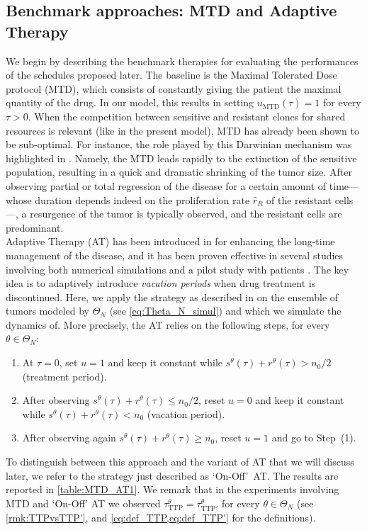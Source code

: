 \documentclass[a4paper,12pt, reqno]{amsart}
\theoremstyle{plain}
\theoremstyle{definition}
\theoremstyle{remark}
\numberwithin{equation}{section}
\begin{document}
\subsection{Benchmark approaches: MTD and Adaptive Therapy} \label{subsec:benchmark}
We begin by describing the benchmark therapies for evaluating the performances of the schedules proposed later.
The baseline is the Maximal Tolerated Dose protocol (MTD), which consists of constantly giving the patient the maximal quantity of the drug. In our model, this results in setting $u_{\mathrm{MTD}}(\tau) = 1$ for every $\tau>0$.
When the competition between sensitive and resistant clones for shared resources is relevant (like in the present model), MTD has already been shown to be sub-optimal. For instance, the role played by this Darwinian mechanism was highlighted in \cite{moff2012evolutionary}.
Namely, the MTD leads rapidly to the extinction of the sensitive population, resulting in a quick and dramatic shrinking of the tumor size. 
After observing partial or total regression of the disease for a certain amount of time---whose duration depends indeed on the proliferation rate $\hat r_R$ of the resistant cells---, a resurgence of the tumor is typically observed, and the resistant cells are predominant. \\
Adaptive Therapy (AT) has been introduced in \cite{moff2009adaptive} for enhancing the long-time management of the disease, and it has been proven effective in several studies involving both numerical simulations \cite{moff2017zhang} and a pilot study with patients \cite{moff2017zhang,moff2022evolution}. 
The key idea is to adaptively introduce \emph{vacation periods} when drug treatment is discontinued.
Here, we apply the strategy as described in  \cite{turnover2021} on the ensemble of tumors modeled by $\Theta_N$ (see \cref{eq:Theta_N_simul}) and which we simulate the {dynamics} of. 
More precisely, the AT relies on the following steps, for every $\theta\in\Theta_N$:
\begin{enumerate}
\item At $\tau =0$, set {$u=1$} and keep it constant while $s^\theta(\tau) + r^\theta(\tau)> n_0/2$ (treatment period).
\item After observing $s^\theta(\tau)+r^\theta(\tau)\leq n_0/2$, reset {$u=0$} and keep it constant while  $s^\theta(\tau) + r^\theta(\tau)< n_0$ (vacation period).
\item After observing again $s^\theta(\tau) + r^\theta(\tau) \geq n_0$, reset {$u=1$} and go to Step~(1).
\end{enumerate}
To distinguish between this approach and the variant of AT that we will discuss later, we refer to the strategy just described as `On-Off'~AT.
The results are reported in \cref{table:MTD_AT1}.
We remark that in the experiments involving MTD and `On-Off' AT we observed $\tau_{\mathrm{TTP}}^\theta = \tau_{\mathrm{TTP'}}^\theta $ for every $\theta\in \Theta_N$ (see \cref{rmk:TTPvsTTP'}, and \cref{eq:def_TTP,eq:def_TTP'} for the definitions).
\end{document}
